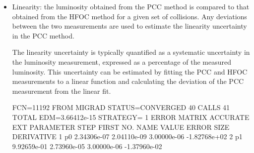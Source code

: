 \begin{itemize}


  
\item Linearity: the luminosity obtained from the PCC method is compared to that obtained from the HFOC method for a given set of collisions. Any deviations between the two measurements are used to estimate the linearity uncertainty in the PCC method.

  The linearity uncertainty is typically quantified as a systematic uncertainty in the luminosity measurement, expressed as a percentage of the measured luminosity. This uncertainty can be estimated by fitting the PCC and HFOC measurements to a linear function and calculating the deviation of the PCC measurement from the linear fit.



                                                                                                                                                                                                                             



FCN=11192 FROM MIGRAD    STATUS=CONVERGED      40 CALLS          41 TOTAL
                     EDM=3.66412e-15    STRATEGY= 1      ERROR MATRIX ACCURATE 
  EXT PARAMETER                                   STEP         FIRST   
  NO.   NAME      VALUE            ERROR          SIZE      DERIVATIVE 
   1  p0           2.34306e-07   2.04110e-09   3.00000e-06  -1.82768e+02
   2  p1           9.92659e-01   2.73960e-05   3.00000e-06  -1.37960e-02




\end{itemize}
